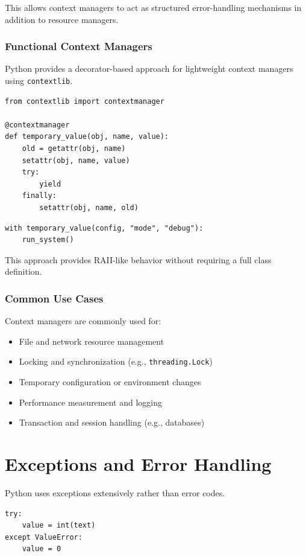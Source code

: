 This allows context managers to act as structured error-handling mechanisms in addition to resource managers.

\subsubsection{Functional Context Managers}

Python provides a decorator-based approach for lightweight context managers using \texttt{contextlib}.

\begin{verbatim}
from contextlib import contextmanager

@contextmanager
def temporary_value(obj, name, value):
    old = getattr(obj, name)
    setattr(obj, name, value)
    try:
        yield
    finally:
        setattr(obj, name, old)
\end{verbatim}

\begin{verbatim}
with temporary_value(config, "mode", "debug"):
    run_system()
\end{verbatim}

This approach provides RAII-like behavior without requiring a full class definition.

\subsubsection{Common Use Cases}

Context managers are commonly used for:
\begin{itemize}
  \item File and network resource management
  \item Locking and synchronization (e.g., \texttt{threading.Lock})
  \item Temporary configuration or environment changes
  \item Performance measurement and logging
  \item Transaction and session handling (e.g., databases)
\end{itemize}

\section{Exceptions and Error Handling}

Python uses exceptions extensively rather than error codes.

\begin{verbatim}
try:
    value = int(text)
except ValueError:
    value = 0
\end{verbatim}

